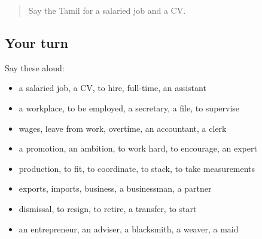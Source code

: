 \label{lesson:TA-R513-review-506-513}



\begin{quote}
Say the Tamil for a salaried job and a CV.
\end{quote}

\subsection*{Your turn}
Say these aloud:

\begin{itemize}
\raggedright
  \item a salaried job, a CV, to hire, full-time, an assistant
  \item a workplace, to be employed, a secretary, a file, to supervise
  \item wages, leave from work, overtime, an accountant, a clerk
  \item a promotion, an ambition, to work hard, to encourage, an expert
  \item production, to fit, to coordinate, to stack, to take measurements
  \item exports, imports, business, a businessman, a partner
  \item dismissal, to resign, to retire, a transfer, to start
  \item an entrepreneur, an adviser, a blacksmith, a weaver, a maid
\end{itemize}

